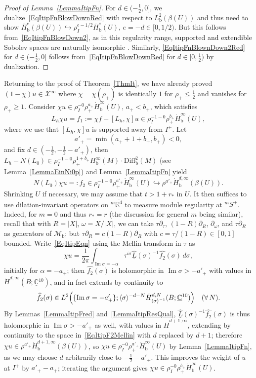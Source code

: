 \documentclass[reqno,11pt,letterpaper]{amsart}
\numberwithin{equation}{section}
\numberwithin{figure}{section}
\theoremstyle{definition}
\theoremstyle{remark}
\newcommand{\mc}{\mathcal}
\newcommand{\cM}{\mc M}
\newcommand{\cX}{\mc X}
\newcommand{\C}{\mathbb{C}}
\newcommand{\R}{\mathbb{R}}
\renewcommand{\Im}{\operatorname{Im}}
\newcommand{\hra}{\hookrightarrow}
\newcommand{\la}{\langle}
\newcommand{\ol}{\overline}
\newcommand{\pa}{\partial}
\newcommand{\ra}{\rangle}
\newcommand{\ul}[1]{\underline{#1}{}}
\newcommand{\wh}{\widehat}
\newcommand{\bop}{{\mathrm{b}}}
\newcommand{\Diff}{\mathrm{Diff}}
\newcommand{\Diffb}{\Diff_\bop}
\newcommand{\half}{\tfrac{1}{2}}
\newcommand{\Hb}{H_{\bop}}
\newcommand{\Hbext}{\bar H_{\bop}}
\newcommand{\Hbsupp}{\dot H_{\bop}}
\newcommand{\Hsupp}{\dot H}
\newcommand{\usref}[1]{{\upshape\ref{#1}}}
\begin{document}
\begin{proof}[Proof of Lemma~\usref{LemmaItipFn}]
  For $d\in(-\half,0]$, we dualize~\eqref{EqItipFnBlowDownRed} with respect to $L^2_\bop(\beta(U))$ and thus need to show $\Hbext^e(\beta(U))\hra\rho_I^{e-1/2}\Hbext^e(U)$, $e=-d\in[0,1/2)$. But this follows from~\eqref{EqItipFnBlowDown2}, as in this regularity range, supported and extendible Sobolev spaces are naturally isomorphic \cite[\S4.5]{TaylorPDE}. Similarly, \eqref{EqItipFnBlownDown2Red} for $d\in(-\half,0]$ follows from~\eqref{EqItipFnBlowDownRed} for $d\in[0,\half)$ by dualization.
\end{proof}


Returning to the proof of Theorem~\ref{ThmIt}, we have already proved $(1-\chi)u\in\cX^\infty$ where $\chi=\chi(\rho_+)$ is identically $1$ for $\rho_+\leq\half$ and vanishes for $\rho_+\geq 1$. Consider $\chi u\in\rho_I^{-0}\rho_+^{a_+}\Hbsupp^\infty(U)$, $a_+<b_+$, which satisfies
\[
  L_h \chi u=f_1:=\chi f+[L_h,\chi]u\in \rho_I^{-1-0}\rho_+^{b_+}\Hbsupp^\infty(U),
\]
where we use that $[L_h,\chi]u$ is supported away from $I^+$. Let
\[
  a'_+=\min(a_+ +1+b_+,b_+)<0,
\]
and fix $d\in(-\half,-\half-a'_+)$, then $L_h-N(L_0)\in \rho_I^{-1-0}\rho_+^{1+b_+}\Hb^\infty(M)\cdot\Diffb^2(M)$ (see Lemma~\ref{LemmaEinNi0p}) and Lemma~\ref{LemmaItipFn} yield
\begin{equation}
\label{EqItipEqn}
  N(L_0)\chi u =: f_2 \in \rho_I^{-1-0}\rho_+^{a'_+}\Hbsupp^\infty(U) \hra \rho^{a'_+}\Hbsupp^{d,\infty}(\beta(U)).
\end{equation}
Shrinking $U$ if necessary, we may assume that $t>1+r_*$ in $U$. It then suffices to use dilation-invariant operators on ${}^m\ol{\R^4}$ to measure module regularity at ${}^mS^+$. Indeed, for $m=0$ and thus $r_*=r$ (the discussion for general $m$ being similar), recall that with $R=|X|$, $\omega=X/|X|$, we can take $\tau\pa_\tau$, $(1-R)\pa_R$, $\pa_\omega$, and $\tau\pa_R$ as generators of $\cM_\bop$; but $\tau\pa_R=c(1-R)\pa_R$ with $c=\tau/(1-R)\in[0,1]$ bounded. Write~\eqref{EqItipEqn} using the Mellin transform in $\tau$ as
\[
  \chi u = \frac{1}{2\pi}\int_{\Im\sigma=-\alpha} \tau^{i\sigma}\wh{\ul L}(\sigma)^{-1}\wh{f_2}(\sigma)\,d\sigma,
\]
initially for $\alpha=-a_+$; then $\wh{f_2}(\sigma)$ is holomorphic in $\Im\sigma>-a'_+$ with values in $\Hsupp^{d,\infty}(B;\ul\C^{10})$, and in fact extends by continuity to
\begin{equation}
\label{EqItipF2Mellin}
  \wh{f_2}(\sigma) \in L^2\Bigl(\{\Im\sigma=-a'_+\}; \la\sigma\ra^{-d-N}\Hsupp_{\la\sigma\ra^{-1}}^{d,N}(B;\ul\C^{10})\Bigr) \quad (\forall\,N).
\end{equation}
By Lemmas~\ref{LemmaItipFred} and~\ref{LemmaItipResQual}, $\wh{\ul L}(\sigma)^{-1}\wh{f_2}(\sigma)$ is thus holomorphic in $\Im\sigma>-a'_+$ as well, with values in $\Hsupp^{d+1,\infty}$, extending by continuity to the space in~\eqref{EqItipF2Mellin} with $d$ replaced by $d+1$; therefore $\chi u\in \rho^{a'_+}\Hbsupp^{d+1,\infty}(\beta(U))$, so $\chi u\in\rho_I^{-0}\rho_+^{a'_+}\Hbsupp^\infty(U)$ by Lemma~\ref{LemmaItipFn}, as we may choose $d$ arbitrarily close to $-\half-a'_+$. This improves the weight of $u$ at $I^+$ by $a'_+-a_+$; iterating the argument gives $\chi u\in\rho_I^{-0}\rho_+^{b_+}\Hbsupp^\infty(U)$.
\end{document}

